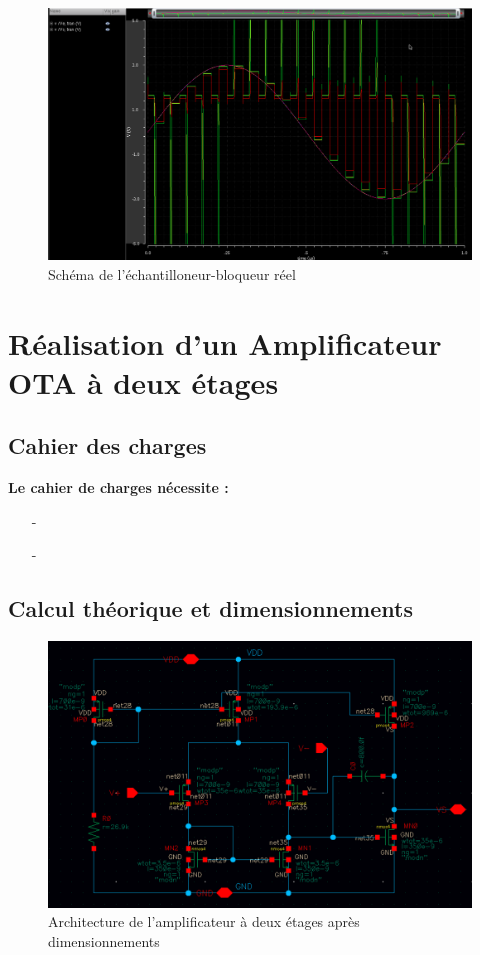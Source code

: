 \documentclass[11pt]{article}
\begin{document}
\begin{figure}[!htb]
\begin{center}
  \includegraphics[width=0.8\linewidth]{simu_ech_bloqueur.png}
  \caption{Sch\'ema de l'\'echantilloneur-bloqueur r\'eel}
\end{center}
\end{figure}


\clearpage
\section{R\'ealisation d'un Amplificateur OTA \`a deux \'etages}

\subsection{Cahier des charges}

\textbf{Le cahier de charges n\'ecessite :}
\begin{itemize} \itemsep -2pt
  \item[-]
  \item[-]
\end{itemize}

\subsection{Calcul th\'eorique et dimensionnements}

\begin{figure}[!htb]
\begin{center}
  \includegraphics[width=\linewidth]{amplificateur_.png}
  \caption{Architecture de l'amplificateur \`a deux \'etages apr\`es dimensionnements}
\end{center}
\end{figure}
\end{document}
